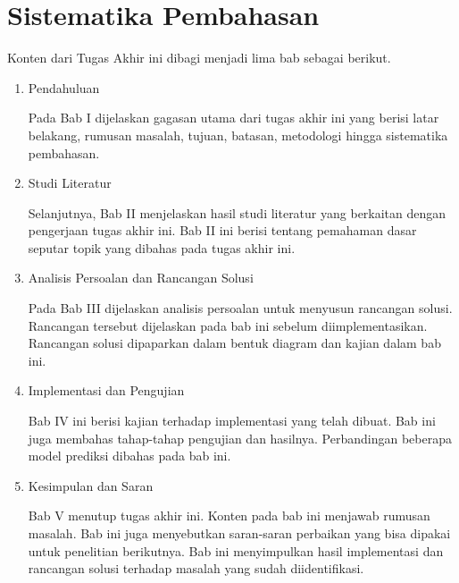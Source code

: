 \section{Sistematika Pembahasan}

Konten dari Tugas Akhir ini  dibagi menjadi lima bab sebagai berikut.
\begin{enumerate}
    \item Pendahuluan

    Pada Bab I  dijelaskan gagasan utama dari tugas akhir ini yang berisi latar belakang, rumusan masalah, tujuan, batasan, metodologi hingga sistematika pembahasan.

    \item Studi Literatur

    Selanjutnya, Bab II  menjelaskan hasil studi literatur yang berkaitan dengan pengerjaan tugas akhir ini. Bab II ini berisi tentang pemahaman dasar seputar topik yang  dibahas pada tugas akhir ini.

    \item Analisis Persoalan dan Rancangan Solusi

    Pada Bab III  dijelaskan analisis persoalan untuk menyusun rancangan solusi. Rancangan tersebut  dijelaskan pada bab ini sebelum diimplementasikan. Rancangan solusi  dipaparkan dalam bentuk diagram dan kajian dalam bab ini.

    \item Implementasi dan Pengujian

    Bab IV ini berisi kajian terhadap implementasi yang telah dibuat. Bab ini juga  membahas tahap-tahap pengujian dan hasilnya. Perbandingan beberapa model prediksi  dibahas pada bab ini.

    \item Kesimpulan dan Saran

    Bab V  menutup tugas akhir ini. Konten pada bab ini  menjawab rumusan masalah. Bab ini juga  menyebutkan saran-saran perbaikan yang bisa dipakai untuk penelitian berikutnya. Bab ini  menyimpulkan hasil implementasi dan rancangan solusi terhadap masalah yang sudah diidentifikasi.
\end{enumerate}

